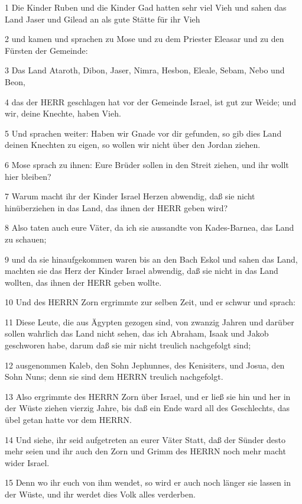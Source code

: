 \par 1 Die Kinder Ruben und die Kinder Gad hatten sehr viel Vieh und sahen das Land Jaser und Gilead an als gute Stätte für ihr Vieh
\par 2 und kamen und sprachen zu Mose und zu dem Priester Eleasar und zu den Fürsten der Gemeinde:
\par 3 Das Land Ataroth, Dibon, Jaser, Nimra, Hesbon, Eleale, Sebam, Nebo und Beon,
\par 4 das der HERR geschlagen hat vor der Gemeinde Israel, ist gut zur Weide; und wir, deine Knechte, haben Vieh.
\par 5 Und sprachen weiter: Haben wir Gnade vor dir gefunden, so gib dies Land deinen Knechten zu eigen, so wollen wir nicht über den Jordan ziehen.
\par 6 Mose sprach zu ihnen: Eure Brüder sollen in den Streit ziehen, und ihr wollt hier bleiben?
\par 7 Warum macht ihr der Kinder Israel Herzen abwendig, daß sie nicht hinüberziehen in das Land, das ihnen der HERR geben wird?
\par 8 Also taten auch eure Väter, da ich sie aussandte von Kades-Barnea, das Land zu schauen;
\par 9 und da sie hinaufgekommen waren bis an den Bach Eskol und sahen das Land, machten sie das Herz der Kinder Israel abwendig, daß sie nicht in das Land wollten, das ihnen der HERR geben wollte.
\par 10 Und des HERRN Zorn ergrimmte zur selben Zeit, und er schwur und sprach:
\par 11 Diese Leute, die aus Ägypten gezogen sind, von zwanzig Jahren und darüber sollen wahrlich das Land nicht sehen, das ich Abraham, Isaak und Jakob geschworen habe, darum daß sie mir nicht treulich nachgefolgt sind;
\par 12 ausgenommen Kaleb, den Sohn Jephunnes, des Kenisiters, und Josua, den Sohn Nuns; denn sie sind dem HERRN treulich nachgefolgt.
\par 13 Also ergrimmte des HERRN Zorn über Israel, und er ließ sie hin und her in der Wüste ziehen vierzig Jahre, bis daß ein Ende ward all des Geschlechts, das übel getan hatte vor dem HERRN.
\par 14 Und siehe, ihr seid aufgetreten an eurer Väter Statt, daß der Sünder desto mehr seien und ihr auch den Zorn und Grimm des HERRN noch mehr macht wider Israel.
\par 15 Denn wo ihr euch von ihm wendet, so wird er auch noch länger sie lassen in der Wüste, und ihr werdet dies Volk alles verderben.
